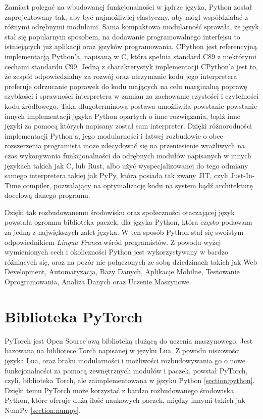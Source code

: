 Zamiast polegać na wbudowanej funkcjonalności w jądrze języka, Python został zaprojektowany tak, aby być najmożliwiej elastyczny, aby mógł współdziałać z różnymi odrębnymi modułami. Sama kompaktowa modularność sprawiła, że język stał się popularnym sposobem, na dodawanie programowalnego interfejsu to istniejących już aplikacji oraz języków programowania.
CPython jest referencyjną implementacją Python'a, napisaną w C, która spełnia standard C89 z niektórymi cechami standardu C99. Jedną z charakterystyk implementacji CPython'a jest to, że zespół odpowiedzialny za rozwój oraz utrzymanie kodu jego interpretera preferuje odrzucanie poprawek do kodu mających na celu marginalną poprawę szybkości i sprawności interpretera w zamian za zachowanie czystości i czytelności kodu źródłowego. Taka długoterminowa postawa umożliwiła powstanie powstanie innych implementacji języka Python opartych o inne rozwiązania, bądź inne języki za pomocą których napisany został sam interpreter. Dzięki różnorodności implementacji Python'a, jego modularności i łatwej rozbudowie o obce rozszerzenia programista może zdecydować się na przeniesienie wrażliwych na czas wykonywania funkcjonalności do odrębnych modułów napisanych w innych językach takich jak C, lub Rust, albo użyć wyspecjalizowanej do tego odmiany samego interpretera takiej jak PyPy, która posiada tak zwany JIT, czyli Just-In-Time compiler, pozwalający na optymalizację kodu na system bądź architekturę docelową danego programu.

Dzięki tak rozbudowanemu środowisku oraz społeczności otaczającej język powstała ogromna biblioteka paczek, dla języka Python, która często podawana za jedną z największych zalet języka. W ten sposób Python stał się swoistym odpowiednikiem \textit{Lingua Franca} wśród programistów. Z powodu wyżej wymienionych cech i okoliczności Python jest wykorzystywany w bardzo różniących się, oraz na pozór nie połączonych ze sobą dziedzinach takich jak Web Development, Automatyzacja, Bazy Danych, Aplikacje Mobilne, Testowanie Oprogramowania, Analiza Danych oraz Uczenie Maszynowe.



\section{Biblioteka PyTorch}
\label{section:pytorch}
PyTorch \cite{PyTorchWebSite} \cite{DeepLearningWithPyTorch} \cite{ProgrammingPyTorchForDeepLearning} \cite{PyTorchPocketReference} jest Open Source'ową biblioteką służącą do uczenia maszynowego. Jest bazowana na bibliotece Torch napisanej w języku Lua. Z powodu niszowości języka Lua, oraz braku modularności i możliwości rozbudowywania go o nowe funkcjonalności za pomocą zewnętrznych modułów i paczek, powstał PyTorch, czyli, biblioteka Torch, ale zaimplementowana w języku Python \ref{section:python}. Dzięki temu PyTorch może korzystać z bardzo rozbudowanego środowiska Python, które oferuje dużą ilość naukowych paczek, między innymi takich jak NumPy \ref{section:numpy}.



